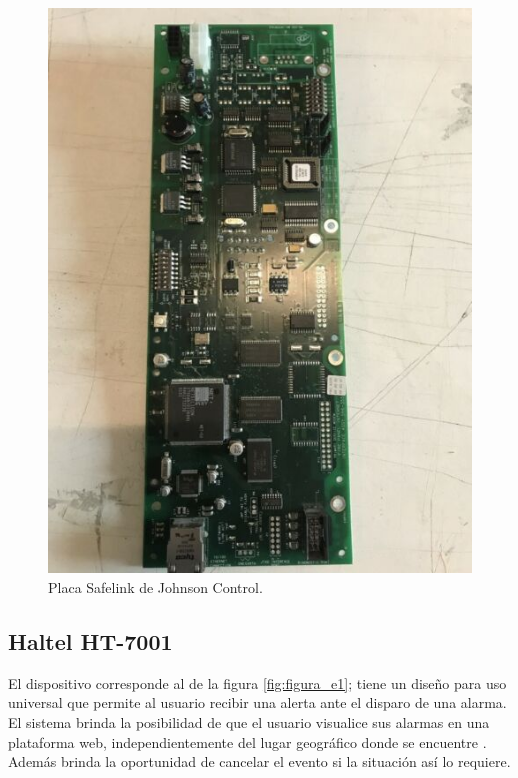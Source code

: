 \begin{figure}[h]
	\centering
	\includegraphics[scale=.4]{./Figures/Capitulo1/FIG_D1.jpg}
	\caption{Placa Safelink de Johnson Control.}
	\label{fig:figura_d1}
\end{figure}

\subsection{Haltel HT-7001}

El dispositivo corresponde al de la figura \ref{fig:figura_e1}; tiene un diseño para uso universal que permite al usuario recibir una alerta ante el disparo de una alarma. El sistema brinda la posibilidad de que el usuario visualice sus alarmas en una plataforma web, independientemente del lugar geográfico donde se encuentre \cite{haltel}. Además brinda la oportunidad de cancelar el evento si la situación así lo requiere. 

